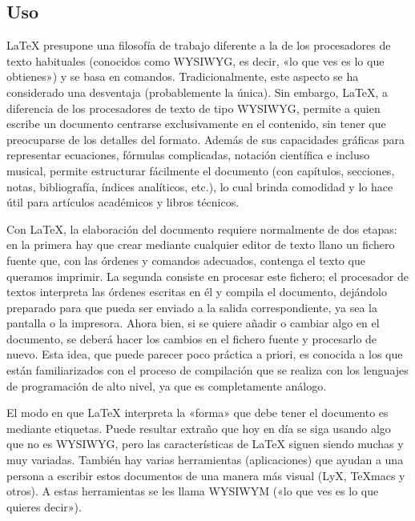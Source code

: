   \subsection{Uso} %
    \label{sub:uso}
    
    LaTeX presupone una filosofía de trabajo diferente a la de los procesadores de texto habituales (conocidos como WYSIWYG, es decir, «lo que ves es lo que obtienes») y se basa en comandos. Tradicionalmente, este aspecto se ha considerado una desventaja (probablemente la única). Sin embargo, LaTeX, a diferencia de los procesadores de texto de tipo WYSIWYG, permite a quien escribe un documento centrarse exclusivamente en el contenido, sin tener que preocuparse de los detalles del formato. Además de sus capacidades gráficas para representar ecuaciones, fórmulas complicadas, notación científica e incluso musical, permite estructurar fácilmente el documento (con capítulos, secciones, notas, bibliografía, índices analíticos, etc.), lo cual brinda comodidad y lo hace útil para artículos académicos y libros técnicos.
    
    Con LaTeX, la elaboración del documento requiere normalmente de dos etapas: en la primera hay que crear mediante cualquier editor de texto llano un fichero fuente que, con las órdenes y comandos adecuados, contenga el texto que queramos imprimir. La segunda consiste en procesar este fichero; el procesador de textos interpreta las órdenes escritas en él y compila el documento, dejándolo preparado para que pueda ser enviado a la salida correspondiente, ya sea la pantalla o la impresora. Ahora bien, si se quiere añadir o cambiar algo en el documento, se deberá hacer los cambios en el fichero fuente y procesarlo de nuevo. Esta idea, que puede parecer poco práctica a priori, es conocida a los que están familiarizados con el proceso de compilación que se realiza con los lenguajes de programación de alto nivel, ya que es completamente análogo.
    
    El modo en que LaTeX interpreta la «forma» que debe tener el documento es mediante etiquetas. Puede resultar extraño que hoy en día se siga usando algo que no es WYSIWYG, pero las características de LaTeX siguen siendo muchas y muy variadas. También hay varias herramientas (aplicaciones) que ayudan a una persona a escribir estos documentos de una manera más visual (LyX, TeXmacs y otros). A estas herramientas se les llama WYSIWYM («lo que ves es lo que quieres decir»).
    
